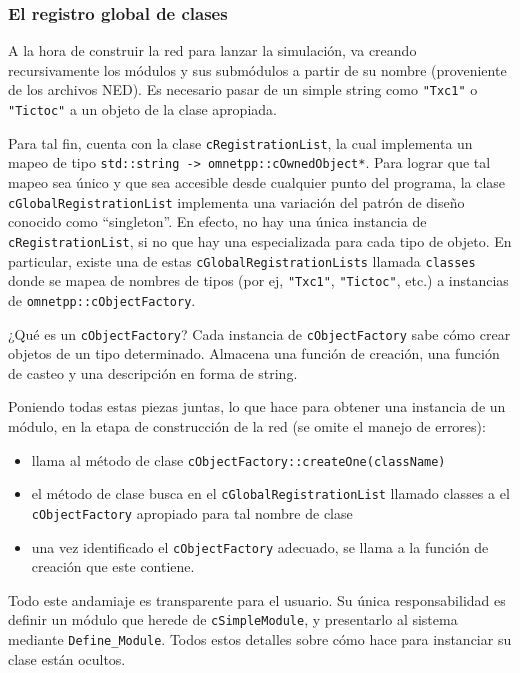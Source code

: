 \documentclass[]{article}
\begin{document}
\subsubsection{El registro global de clases}

A la hora de construir la red para lanzar la simulación, \omnetpp{} va creando
recursivamente los módulos y sus submódulos a partir de su nombre (proveniente
de los archivos NED). Es necesario pasar de un simple string como \verb!"Txc1"!
o \verb!"Tictoc"! a un objeto de la clase apropiada.

Para tal fin, \omnetpp{} cuenta con la clase \verb!cRegistrationList!, la cual
implementa un mapeo de tipo \verb!std::string -> omnetpp::cOwnedObject*!. Para
lograr que tal mapeo sea único y que sea accesible desde cualquier punto del
programa, la clase \verb!cGlobalRegistrationList! implementa una variación del
patrón de diseño conocido como ``singleton''. En efecto, no hay una única
instancia de \verb!cRegistrationList!, si no que hay una especializada para
cada tipo de objeto. En particular, existe una de estas
\verb!cGlobalRegistrationLists! llamada \verb!classes! donde se mapea de
nombres de tipos (por ej, \verb!"Txc1"!, \verb!"Tictoc"!, etc.) a instancias de
\verb!omnetpp::cObjectFactory!.

¿Qué es un \verb!cObjectFactory!? Cada instancia de \verb!cObjectFactory! sabe
cómo crear objetos de un tipo determinado. Almacena una función de creación,
una función de casteo y una descripción en forma de string.

Poniendo todas estas piezas juntas, lo que \omnetpp{} hace para obtener una
instancia de un módulo, en la etapa de construcción de la red (se omite el
manejo de errores):

\begin{itemize}
    \item llama al método de clase \verb!cObjectFactory::createOne(className)!

    \item el método de clase busca en el \verb!cGlobalRegistrationList! llamado
classes a el \verb!cObjectFactory! apropiado para tal nombre de clase

    \item una vez identificado el \verb!cObjectFactory! adecuado, se llama a la
función de creación que este contiene.

\end{itemize}

Todo este andamiaje es transparente para el usuario. Su única responsabilidad
es definir un módulo que herede de \verb!cSimpleModule!, y presentarlo al
sistema mediante \verb!Define_Module!. Todos estos detalles sobre cómo hace
\omnetpp{} para instanciar su clase están ocultos.
\end{document}
